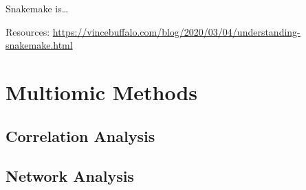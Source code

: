 \documentclass[
]{book}
\begin{document}
Snakemake is\ldots{}

Resources:
\url{https://vincebuffalo.com/blog/2020/03/04/understanding-snakemake.html}

\hypertarget{multiomic-methods}{%
\chapter{Multiomic Methods}\label{multiomic-methods}}

\hypertarget{correlation-analysis}{%
\section{Correlation Analysis}\label{correlation-analysis}}

\hypertarget{network-analysis}{%
\section{Network Analysis}\label{network-analysis}}

  
\end{document}
